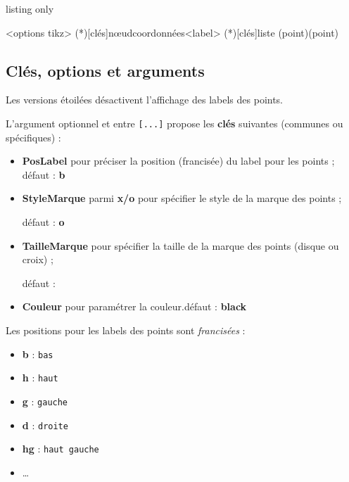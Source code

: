 \documentclass[french,a4paper,11pt]{article}
\newcommand\Cle[1]{{\bfseries\sffamily\textlangle #1\textrangle}}
\begin{document}
\begin{PresCodeTex}{listing only}
\begin{EnvTikzEspace}[Clés]<options tikz>
	\PlacePointEspace(*)[clés]{nœud}{coordonnées}<label>
	\PlacePointsEspace(*)[clés]{liste}
	\TraceSegmentEspace[clés](point)(point)
\end{EnvTikzEspace}
\end{PresCodeTex}

\subsection{Clés, options et arguments}

\begin{tipblock}
Les versions étoilées désactivent l'affichage des labels des points.

\smallskip

L'argument optionnel et entre \texttt{[...]} propose les \Cle{clés} suivantes (communes ou spécifiques) :

\begin{itemize}
	\item \Cle{PosLabel} pour préciser la position (francisée) du label pour les points ; \hfill{}défaut : \Cle{b}
	\item \Cle{StyleMarque} parmi \Cle{x/o} pour spécifier le style de la marque des points ;
	
	\hfill{}défaut : \Cle{o}
	\item \Cle{TailleMarque} pour spécifier la taille de la marque des points (disque ou croix) ;
	
	\hfill{}défaut : \Cle{2pt}
	\item \Cle{Couleur} pour paramétrer la couleur.\hfill{}défaut : \Cle{black}
\end{itemize}
\vspace*{-\baselineskip}\leavevmode
\end{tipblock}

\begin{tipblock}
Les positions pour les labels des points sont \textit{francisées} :

\begin{itemize}
	\item \Cle{b} : \texttt{bas}
	\item \Cle{h} : \texttt{haut}
	\item \Cle{g} : \texttt{gauche}
	\item \Cle{d} : \texttt{droite}
	\item \Cle{hg} : \texttt{haut gauche}
	\item \ldots
\end{itemize}
\vspace*{-\baselineskip}\leavevmode
\end{tipblock}
\end{document}
